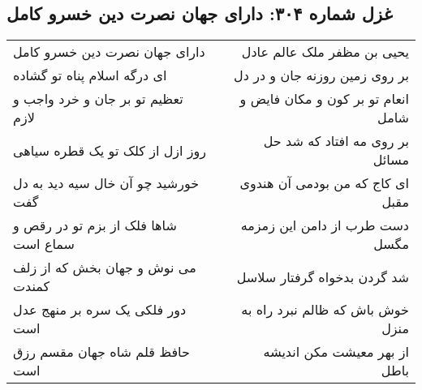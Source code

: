 \begin{center}
\section*{غزل شماره ۳۰۴: دارای جهان نصرت دین خسرو کامل}
\label{sec:sh304}
\begin{longtable}{l p{0.5cm} r}
دارای جهان نصرت دین خسرو کامل
&&
یحیی بن مظفر ملک عالم عادل
\\
ای درگه اسلام پناه تو گشاده
&&
بر روی زمین روزنه جان و در دل
\\
تعظیم تو بر جان و خرد واجب و لازم
&&
انعام تو بر کون و مکان فایض و شامل
\\
روز ازل از کلک تو یک قطره سیاهی
&&
بر روی مه افتاد که شد حل مسائل
\\
خورشید چو آن خال سیه دید به دل گفت
&&
ای کاج که من بودمی آن هندوی مقبل
\\
شاها فلک از بزم تو در رقص و سماع است
&&
دست طرب از دامن این زمزمه مگسل
\\
می نوش و جهان بخش که از زلف کمندت
&&
شد گردن بدخواه گرفتار سلاسل
\\
دور فلکی یک سره بر منهج عدل است
&&
خوش باش که ظالم نبرد راه به منزل
\\
حافظ قلم شاه جهان مقسم رزق است
&&
از بهر معیشت مکن اندیشه باطل
\\
\end{longtable}
\end{center}
